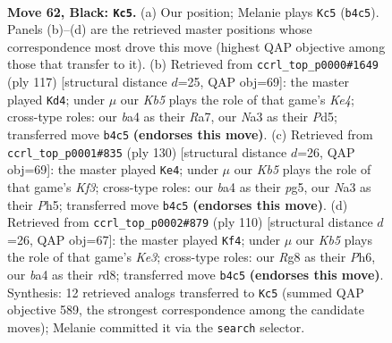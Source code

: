 \documentclass[11pt]{article}
\begin{document}
\clearpage

\begin{figure}[p]\centering
\begin{subfigure}{0.46\textwidth}\centering
\resizebox{\linewidth}{!}{%
\newchessgame
\chessboard[
  setfen={6r1/8/Pp6/5p2/Bk1R1P2/n2K4/8/8 b - - 8 62},
  showmover=false,
  pgfstyle=straightmove, color=movearrow, markmove={b4-c5}
]}
\caption{}
\end{subfigure}\hfill
\begin{subfigure}{0.46\textwidth}\centering
\resizebox{\linewidth}{!}{%
\newchessgame
\chessboard[
  setfen={8/r7/8/3pk3/7p/P3R2P/4K3/8 b - - 13 59},
  showmover=false,
  pgfstyle=straightmove, color=movearrow, markmove={e5-d4}
]}
\caption{}
\end{subfigure}
\\[4pt]
\begin{subfigure}{0.46\textwidth}\centering
\resizebox{\linewidth}{!}{%
\newchessgame
\chessboard[
  setfen={8/3r1k2/4R3/5rpP/2p5/2P2K2/8/R7 w - - 0 66},
  showmover=false,
  pgfstyle=straightmove, color=movearrow, markmove={f3-e4}
]}
\caption{}
\end{subfigure}\hfill
\begin{subfigure}{0.46\textwidth}\centering
\resizebox{\linewidth}{!}{%
\newchessgame
\chessboard[
  setfen={3r3k/5R2/5NpP/1p4P1/8/p1r1K3/8/8 w - - 3 56},
  showmover=false,
  pgfstyle=straightmove, color=movearrow, markmove={e3-f4}
]}
\caption{}
\end{subfigure}
\caption{\textbf{Move 62, Black: \texttt{Kc5}.} (a) Our position; Melanie plays \texttt{Kc5} (\texttt{b4c5}). Panels (b)--(d) are the retrieved master positions whose correspondence most drove this move (highest QAP objective among those that transfer to it). (b) Retrieved from \texttt{ccrl\_top\_p0000\#1649} (ply 117) [structural distance $d$=25, QAP obj=69]: the master played \texttt{Kd4}; under $\mu$ our \emph{Kb5} plays the role of that game's \emph{Ke4}; cross-type roles: our \emph{b}a4 as their \emph{R}a7, our \emph{N}a3 as their \emph{P}d5; transferred move \texttt{b4c5} \textbf{(endorses this move)}. (c) Retrieved from \texttt{ccrl\_top\_p0001\#835} (ply 130) [structural distance $d$=26, QAP obj=69]: the master played \texttt{Ke4}; under $\mu$ our \emph{Kb5} plays the role of that game's \emph{Kf3}; cross-type roles: our \emph{b}a4 as their \emph{p}g5, our \emph{N}a3 as their \emph{P}h5; transferred move \texttt{b4c5} \textbf{(endorses this move)}. (d) Retrieved from \texttt{ccrl\_top\_p0002\#879} (ply 110) [structural distance $d$=26, QAP obj=67]: the master played \texttt{Kf4}; under $\mu$ our \emph{Kb5} plays the role of that game's \emph{Ke3}; cross-type roles: our \emph{R}g8 as their \emph{P}h6, our \emph{b}a4 as their \emph{r}d8; transferred move \texttt{b4c5} \textbf{(endorses this move)}. Synthesis: 12 retrieved analogs transferred to \texttt{Kc5} (summed QAP objective 589, the strongest correspondence among the candidate moves); Melanie committed it via the \texttt{search} selector.}
\label{fig:thought-m123}
\end{figure}
\end{document}
